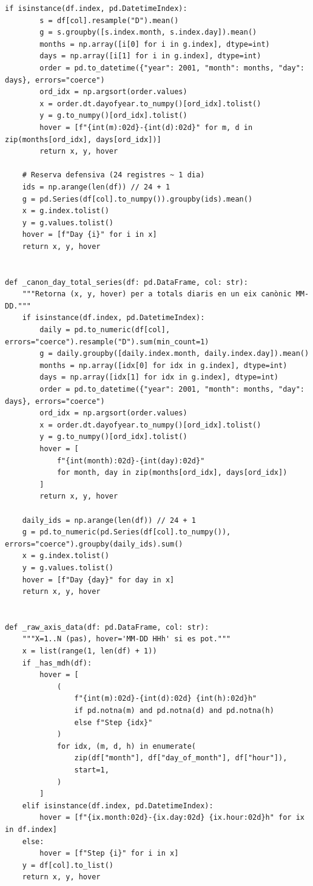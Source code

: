 \documentclass[10pt,a4paper]{article}
\begin{document}
\begin{lstlisting}[style=studioPython,caption={backend/grafics/time\_utils.py},label={lst:backend-grafics-time-utils-py}]
    if isinstance(df.index, pd.DatetimeIndex):
        s = df[col].resample("D").mean()
        g = s.groupby([s.index.month, s.index.day]).mean()
        months = np.array([i[0] for i in g.index], dtype=int)
        days = np.array([i[1] for i in g.index], dtype=int)
        order = pd.to_datetime({"year": 2001, "month": months, "day": days}, errors="coerce")
        ord_idx = np.argsort(order.values)
        x = order.dt.dayofyear.to_numpy()[ord_idx].tolist()
        y = g.to_numpy()[ord_idx].tolist()
        hover = [f"{int(m):02d}-{int(d):02d}" for m, d in zip(months[ord_idx], days[ord_idx])]
        return x, y, hover

    # Reserva defensiva (24 registres ~ 1 dia)
    ids = np.arange(len(df)) // 24 + 1
    g = pd.Series(df[col].to_numpy()).groupby(ids).mean()
    x = g.index.tolist()
    y = g.values.tolist()
    hover = [f"Day {i}" for i in x]
    return x, y, hover


def _canon_day_total_series(df: pd.DataFrame, col: str):
    """Retorna (x, y, hover) per a totals diaris en un eix canònic MM-DD."""
    if isinstance(df.index, pd.DatetimeIndex):
        daily = pd.to_numeric(df[col], errors="coerce").resample("D").sum(min_count=1)
        g = daily.groupby([daily.index.month, daily.index.day]).mean()
        months = np.array([idx[0] for idx in g.index], dtype=int)
        days = np.array([idx[1] for idx in g.index], dtype=int)
        order = pd.to_datetime({"year": 2001, "month": months, "day": days}, errors="coerce")
        ord_idx = np.argsort(order.values)
        x = order.dt.dayofyear.to_numpy()[ord_idx].tolist()
        y = g.to_numpy()[ord_idx].tolist()
        hover = [
            f"{int(month):02d}-{int(day):02d}"
            for month, day in zip(months[ord_idx], days[ord_idx])
        ]
        return x, y, hover

    daily_ids = np.arange(len(df)) // 24 + 1
    g = pd.to_numeric(pd.Series(df[col].to_numpy()), errors="coerce").groupby(daily_ids).sum()
    x = g.index.tolist()
    y = g.values.tolist()
    hover = [f"Day {day}" for day in x]
    return x, y, hover


def _raw_axis_data(df: pd.DataFrame, col: str):
    """X=1..N (pas), hover='MM-DD HHh' si es pot."""
    x = list(range(1, len(df) + 1))
    if _has_mdh(df):
        hover = [
            (
                f"{int(m):02d}-{int(d):02d} {int(h):02d}h"
                if pd.notna(m) and pd.notna(d) and pd.notna(h)
                else f"Step {idx}"
            )
            for idx, (m, d, h) in enumerate(
                zip(df["month"], df["day_of_month"], df["hour"]),
                start=1,
            )
        ]
    elif isinstance(df.index, pd.DatetimeIndex):
        hover = [f"{ix.month:02d}-{ix.day:02d} {ix.hour:02d}h" for ix in df.index]
    else:
        hover = [f"Step {i}" for i in x]
    y = df[col].to_list()
    return x, y, hover



\end{lstlisting}
\end{document}

